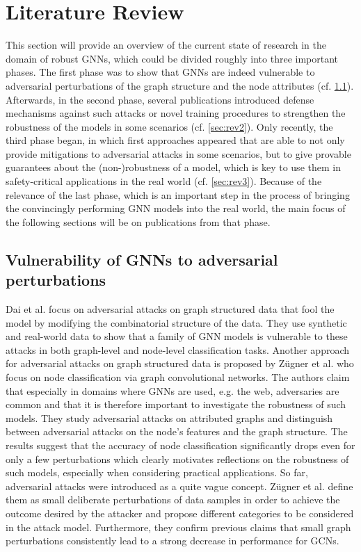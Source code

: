 \documentclass[a4paper,preprint]{sig-alternate}
\begin{document}
\section{Literature Review}
\label{sec:literature}

This section will provide an overview of the current state of research in the domain of robust GNNs, which could be divided
roughly into three important phases.
The first phase was to show that GNNs are indeed vulnerable to adversarial perturbations of the graph structure and the node attributes (cf. \ref{sec:rev1}).
Afterwards, in the second phase, several publications introduced defense mechanisms against such attacks or novel training procedures 
to strengthen the robustness of the models in some scenarios (cf. \ref{sec:rev2}). Only recently, the third phase began, in which first approaches appeared
that are able to not only provide mitigations to adversarial attacks in some scenarios, but to give provable guarantees about the (non-)robustness 
of a model, which is key to use them in safety-critical applications in the real world (cf. \ref{sec:rev3}). Because of the relevance of the last phase, 
which is an important step in the process of bringing the convincingly performing GNN models into the real world, the main focus of the following sections
will be on publications from that phase.

\subsection{Vulnerability of GNNs to adversarial perturbations}
\label{sec:rev1}

Dai et al. \cite{Dai_2018} focus on adversarial attacks on graph structured data that fool the model by modifying the
combinatorial structure of the data. They use synthetic and real-world data to show that a family of GNN models is vulnerable
to these attacks in both graph-level and node-level classification tasks.
Another approach for adversarial attacks on graph structured data is proposed by Zügner et al. \cite{Zuegner_2018} who focus on node classification
via graph convolutional networks.
The authors claim that especially in domains where GNNs are used, e.g. the web, adversaries are common and that it is therefore important
to investigate the robustness of such models. They study adversarial attacks on attributed graphs and distinguish between
adversarial attacks on the node's features and the graph structure. The results suggest that the accuracy of node classification
significantly drops even for only a few perturbations which clearly motivates reflections on the robustness of such models, especially
when considering practical applications.
So far, adversarial attacks were introduced as a quite vague concept. Zügner et al. \cite{zuegner2019adversarial}
define them as small deliberate perturbations of data samples in order to achieve the outcome desired by the attacker
and propose different categories to be considered in the attack model. Furthermore, they confirm previous claims that small graph 
perturbations consistently lead to a strong decrease in performance for GCNs.
\end{document}
